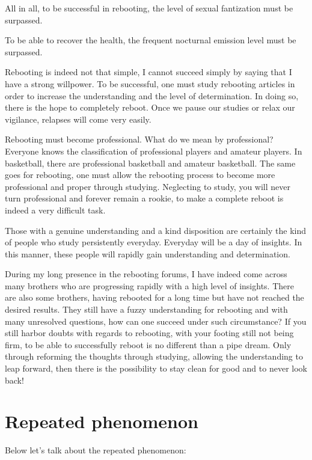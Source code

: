 \documentclass[
]{book}
\begin{document}
All in all, to be successful in rebooting, the level of sexual fantization must be surpassed.

To be able to recover the health, the frequent nocturnal emission level must be surpassed.

Rebooting is indeed not that simple, I cannot succeed simply by saying that I have a strong willpower. To be successful, one must study rebooting articles in order to increase the understanding and the level of determination. In doing so, there is the hope to completely reboot. Once we pause our studies or relax our vigilance, relapses will come very easily.

Rebooting must become professional. What do we mean by professional? Everyone knows the classification of professional players and amateur players. In basketball, there are professional basketball and amateur basketball. The same goes for rebooting, one must allow the rebooting process to become more professional and proper through studying. Neglecting to study, you will never turn professional and forever remain a rookie, to make a complete reboot is indeed a very difficult task.

Those with a genuine understanding and a kind disposition are certainly the kind of people who study persistently everyday. Everyday will be a day of insights. In this manner, these people will rapidly gain understanding and determination.

During my long presence in the rebooting forums, I have indeed come across many brothers who are progressing rapidly with a high level of insights. There are also some brothers, having rebooted for a long time but have not reached the desired results. They still have a fuzzy understanding for rebooting and with many unresolved questions, how can one succeed under such circumstance? If you still harbor doubts with regards to rebooting, with your footing still not being firm, to be able to successfully reboot is no different than a pipe dream. Only through reforming the thoughts through studying, allowing the understanding to leap forward, then there is the possibility to stay clean for good and to never look back!

\hypertarget{repeated-phenomenon}{%
\section{Repeated phenomenon}\label{repeated-phenomenon}}

Below let's talk about the repeated phenomenon:
\end{document}
